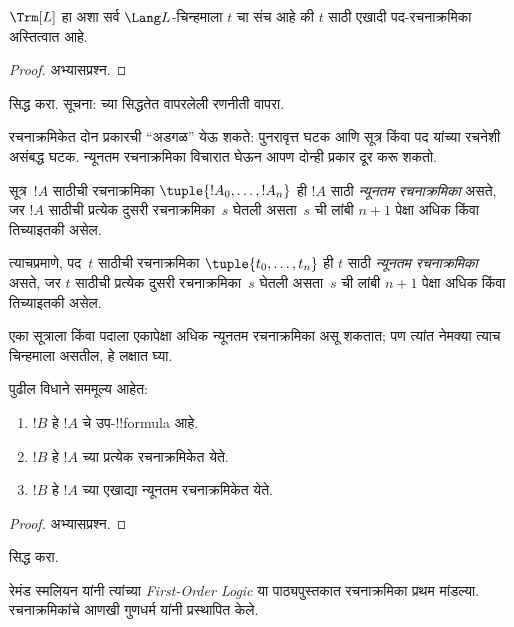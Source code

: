 \documentclass[../../../include/open-logic-section]{subfiles}
\begin{document}
\begin{prop}
$\Trm[L]$ हा अशा सर्व $\Lang L$-चिन्हमाला $t$ चा संच आहे की $t$
साठी एखादी पद-रचनाक्रमिका अस्तित्वात आहे.
\end{prop}

\begin{proof}
अभ्यासप्रश्न.
\end{proof}

\begin{prob}
 सिद्ध करा.
सूचना:  च्या सिद्धतेत वापरलेली
रणनीती वापरा.
\end{prob}

रचनाक्रमिकेत दोन प्रकारची ``अडगळ'' येऊ शकते: पुनरावृत्त घटक आणि सूत्र
किंवा पद यांच्या रचनेशी असंबद्ध घटक. न्यूनतम रचनाक्रमिका विचारात घेऊन
आपण दोन्ही प्रकार दूर करू शकतो.

\begin{defn}
\olmrdefinitionlayout{}
सूत्र~$!A$ साठीची रचनाक्रमिका $\tuple{!A_0, \ldots, !A_n}$ ही
$!A$ साठी \emph{न्यूनतम रचनाक्रमिका} असते, जर $!A$ साठीची प्रत्येक
दुसरी रचनाक्रमिका~$s$ घेतली असता~$s$ ची लांबी $n+1$ पेक्षा अधिक किंवा
तिच्याइतकी असेल.

त्याचप्रमाणे, पद~$t$ साठीची रचनाक्रमिका $\tuple{t_0, \ldots, t_n}$ ही
$t$ साठी \emph{न्यूनतम रचनाक्रमिका} असते, जर $t$ साठीची प्रत्येक
दुसरी रचनाक्रमिका~$s$ घेतली असता~$s$ ची लांबी $n+1$ पेक्षा अधिक किंवा
तिच्याइतकी असेल.
\end{defn}

एका सूत्राला किंवा पदाला एकापेक्षा अधिक न्यूनतम रचनाक्रमिका असू शकतात;
पण त्यांत नेमक्या त्याच चिन्हमाला असतील, हे लक्षात घ्या.

\begin{prop}
पुढील विधाने सममूल्य आहेत:
\begin{enumerate}
    \item $!B$ हे $!A$ चे उप-!!{formula} आहे.
    \item $!B$ हे $!A$ च्या प्रत्येक रचनाक्रमिकेत येते.
    \item $!B$ हे $!A$ च्या एखाद्या न्यूनतम रचनाक्रमिकेत येते.
\end{enumerate}
\end{prop}

\begin{proof}
अभ्यासप्रश्न.
\end{proof}

\begin{prob}
 सिद्ध करा.
\end{prob}

\begin{history}
रेमंड स्मलियन यांनी त्यांच्या \emph{First-Order Logic}
\citep{Smullyan1968} या पाठ्यपुस्तकात रचनाक्रमिका प्रथम मांडल्या.
रचनाक्रमिकांचे आणखी गुणधर्म \citet{Zuckerman1973} यांनी प्रस्थापित केले.
\end{history}
\end{document}
